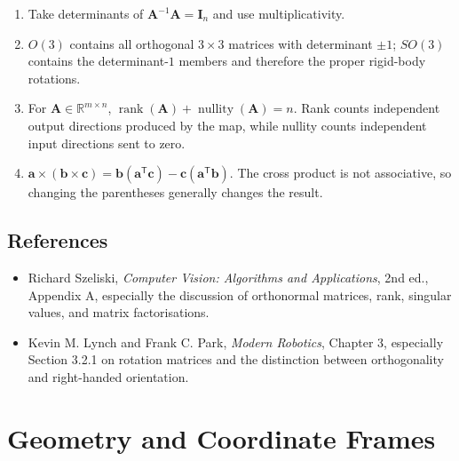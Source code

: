 \documentclass[
  australian,
  12pt,
  letterpaper,
  DIV=11,
  numbers=noendperiod,
  twoside]{scrreprt}
\providecommand{\tightlist}{%
  \setlength{\itemsep}{0pt}\setlength{\parskip}{0pt}}
\begin{document}
\begin{enumerate}
  Therefore, the distinct inputs \(\mathbf x\) and
  \(\mathbf x+\mathbf z\) produce the same output. The output cannot
  reveal the input component in the null-space direction \(\mathbf z\),
  so the input cannot be uniquely recovered. This is the meaning of
  \textbf{lost information} here: an independent input direction or
  degree of freedom has disappeared, not that Shannon information has
  been calculated. Geometrically, the map collapses \(n\)-dimensional
  volume into a lower-dimensional set, which is why its volume-scaling
  factor is zero.
\item
  Take determinants of \(\mathbf A^{-1}\mathbf A=\mathbf I_n\) and use
  multiplicativity.
\item
  \(O(3)\) contains all orthogonal \(3\times3\) matrices with
  determinant \(\pm1\); \(SO(3)\) contains the determinant-\(1\) members
  and therefore the proper rigid-body rotations.
\item
  For \(\mathbf A\in\mathbb R^{m\times n}\),
  \(\operatorname{rank}(\mathbf A)+\operatorname{nullity}(\mathbf A)=n\).
  Rank counts independent output directions produced by the map, while
  nullity counts independent input directions sent to zero.
\item
  \(\mathbf a\times(\mathbf b\times\mathbf c)=\mathbf b(\mathbf a^\mathsf T\mathbf c)-\mathbf c(\mathbf a^\mathsf T\mathbf b)\).
  The cross product is not associative, so changing the parentheses
  generally changes the result.
\end{enumerate}

\section*{References}\label{references}


\begin{itemize}
\tightlist
\item
  Richard Szeliski, \emph{Computer Vision: Algorithms and Applications},
  2nd ed., Appendix A, especially the discussion of orthonormal
  matrices, rank, singular values, and matrix factorisations.
\item
  Kevin M. Lynch and Frank C. Park, \emph{Modern Robotics}, Chapter 3,
  especially Section 3.2.1 on rotation matrices and the distinction
  between orthogonality and right-handed orientation.
\end{itemize}

\chapter{Geometry and Coordinate
Frames}\label{sec-geometry-coordinate-frames}
\end{document}
